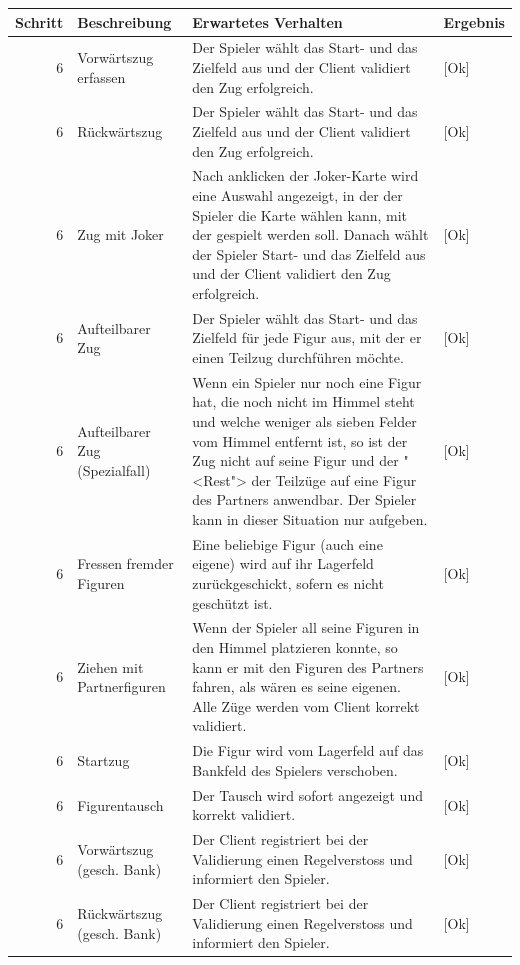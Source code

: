 \documentclass[12pt,halfparskip]{scrartcl}
\begin{document}
	\begin {tabular}{r | p{3cm} | p{8cm} | l}
		\toprule
		\textbf{Schritt} & \textbf{Beschreibung} & \textbf{Erwartetes Verhalten} & \textbf{Ergebnis} \\
		\midrule
		6 & Vorwärtszug erfassen & Der Spieler wählt das Start- und das Zielfeld aus und der Client validiert den Zug erfolgreich. & [Ok] \\
		\midrule
		6 & Rückwärtszug & Der Spieler wählt das Start- und das Zielfeld aus und der Client validiert den Zug erfolgreich. & [Ok] \\
		\midrule
		6 & Zug mit Joker & Nach anklicken der Joker-Karte wird eine Auswahl angezeigt, in der der Spieler die Karte wählen kann, mit der gespielt werden soll. Danach wählt der Spieler Start- und das Zielfeld aus und der Client validiert den Zug erfolgreich. & [Ok] \\
		\midrule
		6 & Aufteilbarer Zug & Der Spieler wählt das Start- und das Zielfeld für jede Figur aus, mit der er einen Teilzug durchführen möchte. & [Ok] \\
		\midrule
		6 & Aufteilbarer Zug (Spezialfall) & Wenn ein Spieler nur noch eine Figur hat, die noch nicht im Himmel steht und welche weniger als sieben Felder vom Himmel entfernt ist, so ist der Zug nicht auf seine Figur und der "<Rest"> der Teilzüge auf eine Figur des Partners anwendbar. Der Spieler kann in dieser Situation nur aufgeben. & [Ok] \\
		\midrule
		6 & Fressen fremder Figuren & Eine beliebige Figur (auch eine eigene) wird auf ihr Lagerfeld zurückgeschickt, sofern es nicht geschützt ist. & [Ok] \\
		\midrule
		6 & Ziehen mit Partnerfiguren & Wenn der Spieler all seine Figuren in den Himmel platzieren konnte, so kann er mit den Figuren des Partners fahren, als wären es seine eigenen. Alle Züge werden vom Client korrekt validiert. & [Ok] \\
		\midrule
		6 & Startzug & Die Figur wird vom Lagerfeld auf das Bankfeld des Spielers verschoben. & [Ok] \\
		\midrule
		6 & Figurentausch & Der Tausch wird sofort angezeigt und korrekt validiert. & [Ok] \\
		\midrule
		6 & Vorwärtszug (gesch. Bank) & Der Client registriert bei der Validierung einen Regelverstoss und informiert den Spieler. & [Ok] \\
		\midrule
		6 & Rückwärtszug (gesch. Bank) & Der Client registriert bei der Validierung einen Regelverstoss und informiert den Spieler. & [Ok] \\
		\bottomrule
	\end{tabular}
	
\end{document}
